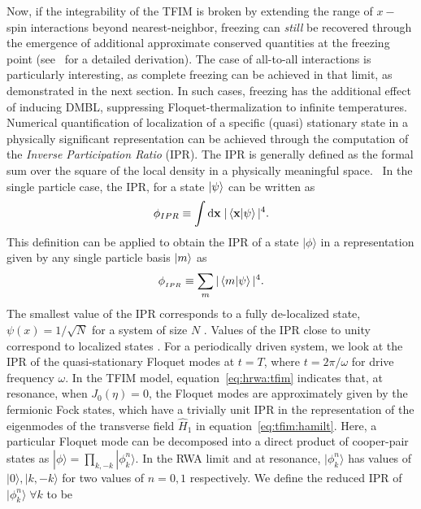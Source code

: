 \documentclass[%
reprint,
superscriptaddress,
amsmath,amssymb,
aps,
prb,
showkeys,
]{revtex4-2}
\begin{document}
Now, if the integrability of the TFIM is broken by extending the range of $x-$spin interactions beyond nearest-neighbor, freezing can \textit{still} be recovered through the emergence of additional approximate conserved quantities at the freezing point (see~\cite{rahaman2024time} for a detailed derivation). The case of all-to-all interactions is particularly interesting, as complete freezing can be achieved in that limit, as demonstrated in the next section. In such cases, freezing has the additional effect of inducing DMBL, suppressing Floquet-thermalization to infinite temperatures. Numerical quantification of localization of a specific (quasi) stationary state in a physically significant representation can be achieved through the computation of the \emph{Inverse Participation Ratio} (IPR).  {The IPR is generally defined as the formal sum over the square of the local density in a physically meaningful space.}~\cite{mukherjee_modulation-assisted_2015,lin_many-body_2018,murphy_generalized_2011, torres-herrera_self-averaging_2020} {In the single particle case,  the IPR, } for a state $\ket{\psi}$ can be written as
\begin{equation*}
	\phi_{IPR}\equiv \int \mathrm{d}\mathbf{x}\;\vert\ip{\mathbf{x}}{\psi}\vert^4.
\end{equation*}
This definition can be {applied} to {obtain} the IPR of a state $|\phi\rangle$ in a representation given by {any single particle} basis $\ket{m}$ as 
\begin{equation}
\label{eq:ipr:defn}
\phi_{{_{IPR}}} \equiv \sum_m\vert\ip{m}{\psi}\vert^4.
\end{equation}
The smallest value of the IPR corresponds to a fully de-localized state, $\psi(x)=1/\sqrt{N}$ for a system of size $N$ \cite{torres-herrera_self-averaging_2020,trivedi_can_2005}. Values of the IPR close to unity correspond to localized states \cite{Misguich2016}. For a periodically driven system, we look at the IPR of the quasi-stationary Floquet modes at $t=T$, where $t=2\pi/\omega$ for drive frequency $\omega$. In the TFIM model, equation~\ref{eq:hrwa:tfim} indicates that, at resonance, when $J_0(\eta)=0$, the Floquet modes are approximately given by the fermionic Fock states, which have a trivially unit IPR in the representation of the eigenmodes of the transverse field $\hat{H}_1$ in equation~\ref{eq:tfim:hamilt}. Here, a particular Floquet mode can be decomposed into a direct product of cooper-pair states as $|\phi\rangle = \prod_{k,-k}|\phi^n_k\rangle$. In the RWA limit and at resonance, $|\phi^n_k\rangle$ has values of $|0\rangle, |k,-k\rangle$ for two values of $n=0,1$ respectively. We define the reduced IPR of $|\phi^n_k\rangle\; \forall k$ to be
\end{document}
